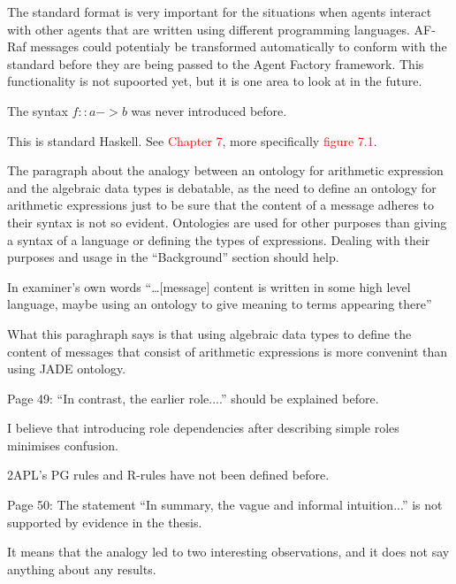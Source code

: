 \documentclass{article}
\newcommand*\R[1]{\textcolor{red}{#1}} %
\newcommand{\todo}[1]{[\textcolor{green}{TODO}: #1]}
\newenvironment{them}{\noindent\begingroup\color{blue}}{\endgroup\par}
\begin{document}
The standard format is very important for the situations when agents interact
with other agents that are written using different programming languages.
AF-Raf messages could potentialy be transformed automatically to conform with
the standard before they are being passed to the Agent Factory framework. This
functionality is not supoorted yet, but it is one area to look at in the
future.

\begin{them}

The syntax $f::a->b$ was never introduced before.
\end{them}
This is standard Haskell. See \R{Chapter 7}, more specifically \R{figure 7.1}.

\begin{them}

The paragraph about the analogy between an ontology for arithmetic expression
and the algebraic data types is debatable, as the need to define an ontology
for arithmetic expressions just to be sure that the content of a message
adheres to their syntax is not so evident. Ontologies are used for other
purposes than giving a syntax of a language or defining the types of
expressions. Dealing with their purposes and usage in the “Background” section
should help.

\end{them}
In examiner's own words ``\ldots [message] content is written in some high
level language, maybe using an ontology to give meaning to terms appearing
there''

What this paraghraph says is that using algebraic data types to define the
content of messages that consist of arithmetic expressions is more convenint
than using JADE ontology.

\begin{them}

Page 49:
“In contrast, the earlier role....” should be explained before.
\end{them}
I believe that introducing role dependencies after describing simple roles
minimises confusion.

\begin{them}

2APL's PG rules and R-rules have not been defined before.
\end{them}
\todo{define 2APL`s rules}

\begin{them}

Page 50:
The statement “In summary, the vague and informal intuition...” is not
supported by evidence in the thesis.

\end{them}
It means that the analogy led to two interesting observations, and it does not
say anything about any results.
\end{document}
